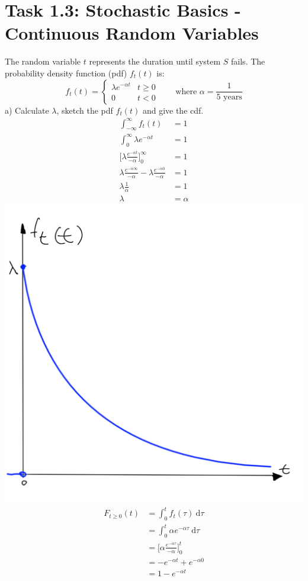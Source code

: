 \documentclass[a4paper,footsepline]{scrartcl}
\begin{document}
	\section*{Task 1.3: Stochastic Basics - Continuous Random Variables}
	The random variable $t$ represents the duration until system $S$ fails. The probability density
	function (pdf) $f_t(t)$ is:
	\[f_t(t) = \begin{cases} 
	\lambda e^{-\alpha t} & t \geq 0\\
	0 & t < 0
	\end{cases} \qquad \text{where } \alpha=\frac{1}{5 \text{ years}} \]
	a) Calculate $\lambda$, sketch the pdf $f_t(t)$ and give the cdf.
	\begin{align*}
		\int_{-\infty}^{\infty} f_t(t) &= 1\\
		\int_{0}^{\infty} \lambda e^{-\alpha t} &= 1\\
		\Big[ \lambda \frac{e^{-\alpha t}}{- \alpha}\Big]_0^\infty &= 1 \\
		\lambda \frac{e^{-\alpha \infty}}{- \alpha} - 	\lambda \frac{e^{-\alpha 0}}{- \alpha} &= 1 \\
		\lambda \frac{1}{\alpha} &= 1 \\
		\lambda &= \alpha
	\end{align*}
	\includegraphics[width=\textwidth]{sketch.png}
	\begin{align*}
	F_{t \geq 0}(t) &= \int_{0}^{t} f_t(\tau)\ \text{d} \tau \\
	&= \int_{0}^{t} \alpha e^{-\alpha \tau}\ \text{d} \tau\\
	&= 	\Big[ \alpha \frac{e^{-\alpha \tau}}{- \alpha}\Big]_0^t\\
	&= - e^{-\alpha t} + e^{-\alpha 0}\\
	&= 1-e^{-\alpha t}
	\end{align*}
\end{document}
